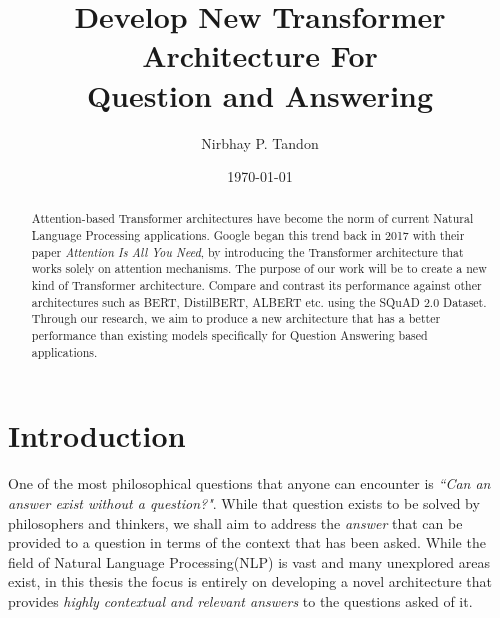 \documentclass[a4paper,12pt]{report}
\begin{document}
    \title{Develop New Transformer Architecture For \\ Question and Answering}

    \author{Nirbhay P. Tandon}

    \date{\vfill \monthyeardate\today}
    \maketitle


    \newpage
    \newpage
    \tableofcontents
    \newpage
    \listoffigures
    \listoftables
    
    \printnomenclature[1in]
	\begin{abstract}
		Attention-based Transformer architectures have become the norm of current Natural Language Processing applications. Google began this trend back in 2017 with their paper \textit{Attention Is All You Need}, by introducing the Transformer architecture that works solely on attention mechanisms. The purpose of our work will be to create a new kind of Transformer architecture. Compare and contrast its performance against other architectures such as BERT, DistilBERT, ALBERT etc. using the SQuAD 2.0 Dataset. Through our research, we aim to produce a new architecture that has a better performance than existing models specifically for Question Answering based applications.
	\end{abstract}

    \chapter{\centering Introduction}\label{c1introduction}

    One of the most philosophical questions that anyone can encounter is \textit{``Can an answer exist without a question?"}. While that question exists to be solved by philosophers and thinkers, we shall aim to address the \textit{answer} that can be provided to a question in terms of the context that has been asked. While the field of Natural Language Processing(NLP) is vast and many unexplored areas exist, in this thesis the focus is entirely on developing a novel architecture that provides \textit{highly contextual and relevant answers} to the questions asked of it.
\end{document}
